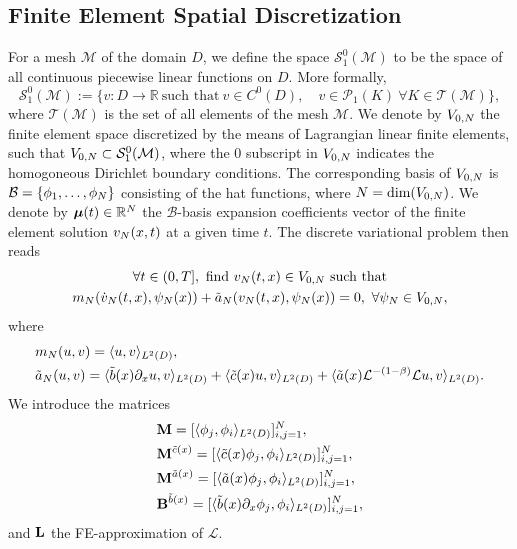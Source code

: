 \subsection{Finite Element Spatial Discretization} 
For a mesh $\mathcal{M}$ of the domain $D$, we define the space $\mathcal{S}_1^0(\mathcal{M})$ to be the space of all continuous piecewise linear functions on $D$. More formally, 
\begin{equation*}
\mathcal{S}_1^0(\mathcal{M}):= \{v:D\to\mathbb{R} \ \text{such that} \  v \in C^0(D),\quad v\in \mathcal{P}_1(K) \ \forall K\in\mathcal{T}(\mathcal{M}) \},
\end{equation*}
where $\mathcal{T}(\mathcal{M})$ is the set of all elements of the mesh $\mathcal{M}$. We denote by $V_{0,N}$ the finite element space discretized by the means of Lagrangian linear finite elements, such that $V_{0,N} \subset \mathcal{S}_1^0(\mathcal{M}) $, where the $0$ subscript in $V_{0,N}$ indicates the homogoneous Dirichlet boundary conditions. The corresponding basis of $V_{0,N}$ is $\mathcal{B} = \{\phi_1,\dots,\phi_{N}\}$ consisting of the hat functions, where $N = \text{dim}(V_{0,N})$.
We denote by $\bm{\mu}(t)\in \mathbb{R}^{N}$ the $\mathcal{B}$-basis expansion coefficients vector of the finite element solution $v_{N}(x,t)$ at a given time $t$. The discrete variational problem then reads
\begin{equation}\label{discrete_vf}
\begin{gathered} 
\forall t \in (0,T],   \ \text{find}  \ v_{\dofs}(t,x) \in \discspace  \ \text{such that} \\ 
m_{\dofs}(\dot{v}_{\dofs}(t,x), \psi_{\dofs}(x)) + \tilde{a}_{\dofs}(v_{\dofs}(t,x), \psi_{\dofs}(x)) = 0, \ \forall \psi_{\dofs} \in \discspace,
\end{gathered}
\end{equation}
where 
\begin{align*}
\begin{split}
&m_{N}(u,v) = \langle u,v \rangle_{L^2(D)},\\
 &\tilde{a}_{N}(u,v) = \langle\tilde{b}(x)\partial_xu,v\rangle_{L^2(D)} + \langle\tilde{c}(x)u,v\rangle_{L^2(D)} + \langle\tilde{a}(x)\mathcal{L}^{-(1-\beta)}\mathcal{L}u,v\rangle_{L^2(D)} .
 \end{split}
\end{align*}
We introduce the matrices
\begin{align*}
\begin{split}
&\mathbf{M} = [\langle \phi_j,\phi_i\rangle_{L^2(D)}]_{i,j=1}^N, \\
&\mathbf{M}^{\tilde{c}(x)} = [\langle\tilde{c}(x)\phi_j,\phi_i \rangle_{L^2(D)}]_{i,j=1}^N, \\
&\mathbf{M}^{\tilde{a}(x)} = [\langle\tilde{a}(x)\phi_j,\phi_i \rangle_{L^2(D)}]_{i,j=1}^N, \\
& \mathbf{B}^{\tilde{b}(x)} = [\langle\tilde{b}(x)\partial_x\phi_j,\phi_i \rangle_{L^2(D)}]_{i,j=1}^N,
\end{split}
\end{align*}
and $\mathbf{L}$ the FE-approximation of $\mathcal{L}$. 

